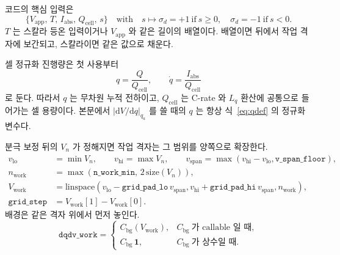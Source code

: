 \documentclass[11pt,a4paper]{article}
\newcommand{\dd}{\mathrm{d}}
\newcommand{\app}{\mathrm{app}}
\newcommand{\cellc}{\mathrm{cell}}
\newcommand{\bg}{\mathrm{bg}}
\newcommand{\work}{\mathrm{work}}
\newcommand{\abs}{\mathrm{abs}}
\newcommand{\lo}{\mathrm{lo}}
\newcommand{\hi}{\mathrm{hi}}
\begin{document}
코드의 핵심 입력은
\begin{equation}
\{V_{\app},\,T,\,I_{\abs},\,Q_{\cellc},\,s\}
\quad\text{with}\quad s\mapsto\sigma_d=+1\ \text{if}\ s\ge0,\quad \sigma_d=-1\ \text{if}\ s<0.
\label{eq:n0input}
\end{equation}
$T$ 는 스칼라 등온 입력이거나 $V_{\app}$ 와 같은 길이의 배열이다. 배열이면 뒤에서 작업 격자에 보간되고, 스칼라이면 같은 값으로 채운다.

셀 정규화 진행량은 첫 사용부터
\begin{equation}
q=\frac{Q}{Q_{\cellc}},\qquad
\dot q=\frac{I_{\abs}}{Q_{\cellc}}
\label{eq:qdef}
\end{equation}
로 둔다. 따라서 $q$ 는 무차원 누적 전하이고, $Q_{\cellc}$ 는 C-rate 와 $L_q$ 환산에 공통으로 들어가는 셀 용량이다. 본문에서 $|\dd V/\dd q|_{q_a}$ 를 쓸 때의 $q$ 는 항상 식~\eqref{eq:qdef} 의 정규화 변수다.

분극 보정 뒤의 $V_n$ 가 정해지면 작업 격자는 그 범위를 양쪽으로 확장한다.
\begin{align}
v_{\lo}&=\min V_n,\qquad v_{\hi}=\max V_n,\qquad
v_{\mathrm{span}}=\max(v_{\hi}-v_{\lo},\texttt{v\_span\_floor}),\label{eq:vspan}\\
n_{\work}&=\max(\texttt{n\_work\_min},\,2\,\mathrm{size}(V_n)),\label{eq:nwork}\\
V_{\work}&=\mathrm{linspace}\!\left(v_{\lo}-\texttt{grid\_pad\_lo}\,v_{\mathrm{span}},
v_{\hi}+\texttt{grid\_pad\_hi}\,v_{\mathrm{span}},n_{\work}\right),\label{eq:vwork}\\
\texttt{grid\_step}&=V_{\work}[1]-V_{\work}[0].\label{eq:gridstep}
\end{align}
배경은 같은 격자 위에서 먼저 놓인다.
\begin{equation}
\texttt{dqdv\_work}=
\begin{cases}
C_{\bg}(V_{\work}),& C_{\bg}\ \text{가 callable 일 때},\\
C_{\bg}\,\bm 1,& C_{\bg}\ \text{가 상수일 때}.
\end{cases}
\label{eq:cbgwork}
\end{equation}
\end{document}
